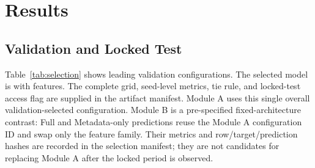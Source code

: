 \documentclass[conference]{IEEEtran}
\begin{document}
\begin{center}
\end{center}

\section{Results}
\subsection{Validation and Locked Test}
Table~\ref{tab:selection} shows leading validation configurations. The selected
model is \AuditSelectedModel{} with \AuditSelectedFamily{} features. The complete
grid, seed-level metrics, tie rule, and locked-test access flag are supplied in the
artifact manifest. Module A uses this single overall validation-selected
configuration. Module B is a pre-specified fixed-architecture contrast: Full and
Metadata-only predictions reuse the Module A configuration ID and swap only the
feature family. Their metrics and row/target/prediction hashes are recorded in
the selection manifest; they are not candidates for replacing Module A after the
locked period is observed.

\begin{table}[t]
\centering
\caption{Validation selection on 2012--2015. RMSE is computed after fixed-seed
prediction aggregation; Seed SD is the across-seed RMSE standard deviation, and
$P$(rank 1) is the seed-level first-rank frequency for stochastic candidates;
Ridge is deterministic and shown as N/A. Role separates the Module A winner from
the fixed-architecture Module B/D representatives.}
\label{tab:selection}
\scriptsize
\resizebox{\columnwidth}{!}{}
\end{table}
\end{document}
